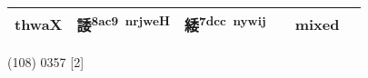 \documentclass[14pt,a4paper]{scrartcl}
\begin{document}
\begin{longtable}[c]{@{}llllll@{}}
\begin{minipage}[t]{0.14\columnwidth}
thwaX
\strut\end{minipage} &
\begin{minipage}[t]{0.14\columnwidth}\raggedright\strut
諉\textsuperscript{8ac9~nrjweH}
\strut\end{minipage} &
\begin{minipage}[t]{0.14\columnwidth}\raggedright\strut
緌\textsuperscript{7dcc~nywij}
\strut\end{minipage} &
\begin{minipage}[t]{0.14\columnwidth}\raggedright\strut
\strut\end{minipage} &
\begin{minipage}[t]{0.14\columnwidth}\raggedright\strut
mixed
\strut\end{minipage}\tabularnewline
\bottomrule
\end{longtable}

(108) 0357 {[}2{]}
\end{document}
